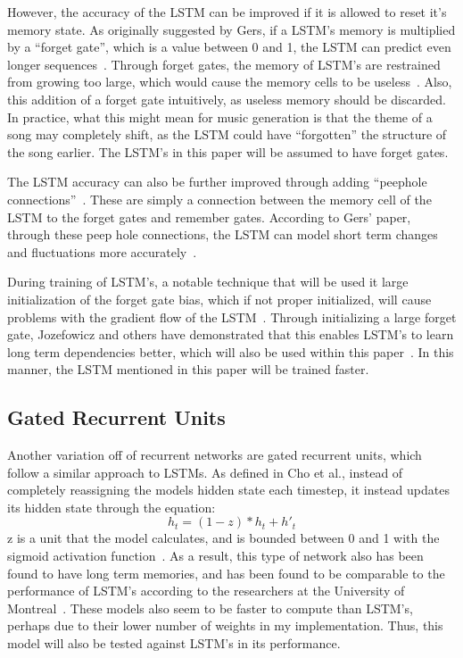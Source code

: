 \documentclass[12pt, titlepage]{article}
\begin{document}
However, the accuracy of the LSTM can be improved if it is allowed to reset it's
memory state. As originally suggested by Gers, if a LSTM's memory is multiplied
by a ``forget gate'', which is a value between 0 and 1, the LSTM can predict
even longer sequences~\cite{forgetgate}. Through forget gates, the memory of
LSTM's are restrained from growing too large, which would cause the memory cells
to be useless~\cite{forgetgate}. Also, this addition of a forget gate
intuitively, as useless memory should be discarded. In practice, what this might
mean for music generation is that the theme of a song may completely shift, as
the LSTM could have ``forgotten'' the structure of the song earlier. The LSTM's
in this paper will be assumed to have forget gates.

The LSTM accuracy can also be further improved through adding ``peephole
connections''~\cite{lstmpeep}. These are simply a connection between the memory
cell of the LSTM to the forget gates and remember gates. According to Gers'
paper, through these peep hole connections, the LSTM can model short term
changes and fluctuations more accurately~\cite{lstmpeep}.

During training of LSTM's, a notable technique that will be used it large
initialization of the forget gate bias, which if not proper initialized, will
cause problems with the gradient flow of the LSTM~\cite{lstmbias}. Through
initializing a large forget gate, Jozefowicz and others have demonstrated that
this enables LSTM's to learn long term dependencies better, which will also be
used within this paper~\cite{lstmbias}. In this manner, the LSTM mentioned in
this paper will be trained faster.


\subsection{Gated Recurrent Units}
Another variation off of recurrent networks are gated recurrent units, which
follow a similar approach to LSTMs. As defined in Cho et al., instead of
completely reassigning the models hidden state each timestep, it instead updates
its hidden state through the equation:
$$h_t = (1 - z) * h_t + h'_t $$
z is a unit that the model calculates, and is bounded between 0 and 1 with the
sigmoid activation function~\cite{gru}. As a result, this type of network also
has been found to have long term memories, and has been found to be comparable
to the performance of LSTM's according to the researchers at the University of
Montreal~\cite{gru}. These models also seem to be faster to compute than LSTM's,
perhaps due to their lower number of weights in my implementation. Thus, this
model will also be tested against LSTM's in its performance.
\end{document}

